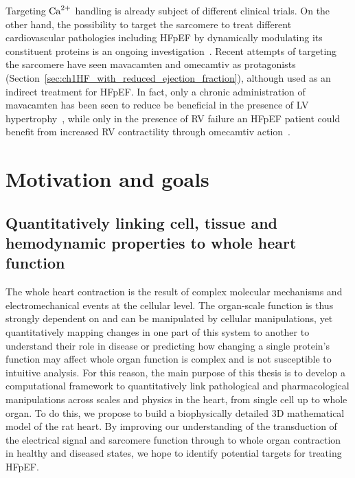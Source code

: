 \vspace{0.2cm}
Targeting $\textrm{Ca}^{2+}$ handling is already subject of different clinical trials. On the other hand, the possibility to target the sarcomere to treat different cardiovascular pathologies including HFpEF by dynamically modulating its constituent proteins is an ongoing investigation~\cite{Patel:2019}. Recent attempts of targeting the sarcomere have seen mavacamten and omecamtiv as protagonists (Section~\ref{sec:ch1HF_with_reduced_ejection_fraction}), although used as an indirect treatment for HFpEF. In fact, only a chronic administration of mavacamten has been seen to reduce be beneficial in the presence of LV hypertrophy~\cite{Green:2016}, while only in the presence of RV failure an HFpEF patient could benefit from increased RV contractility through omecamtiv action~\cite{Planelles-Herrero:2017}.


%
%
%
\section{Motivation and goals}\label{sec:ch1motivation_and_goals}

%
%
%
\subsection{Quantitatively linking cell, tissue and hemodynamic properties to whole heart function}
The whole heart contraction is the result of complex molecular mechanisms and electromechanical events at the cellular level. The organ-scale function is thus strongly dependent on and can be manipulated by cellular manipulations, yet quantitatively mapping changes in one part of this system to another to understand their role in disease or predicting how changing a single protein's function may affect whole organ function is complex and is not susceptible to intuitive analysis. For this reason, the main purpose of this thesis is to develop a computational framework to quantitatively link pathological and pharmacological manipulations across scales and physics in the heart, from single cell up to whole organ. To do this, we propose to build a biophysically detailed $3$D mathematical model of the rat heart. By improving our understanding of the transduction of the electrical signal and sarcomere function through to whole organ contraction in healthy and diseased states, we hope to identify potential targets for treating HFpEF.


%
%
%
